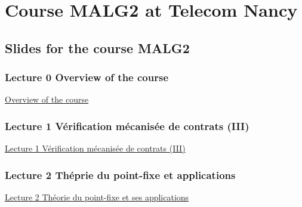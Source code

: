 \documentclass[ 12pt]{article}
\begin{document}
\section{Course MALG2 at Telecom Nancy}
\label{sec:course-mcfsi-at}


\subsection{Slides for the course MALG2}
\label{sec:slides}


\subsubsection{Lecture 0  {Overview of the course }}
  
  \href{http://mery54.github.io/teaching/movex/lecturesnotes/malglecture0.pdf}{Overview of the course }


   \subsubsection{Lecture 1 {Vérification  mécanisée de contrats} (III)}

   \href{http://mery54.github.io/teaching/movex/lecturesnotes/malglecture1.pdf}{Lecture
     1  Vérification  mécanisée de contrats (III)}


   
   \subsubsection{Lecture 2 {Théprie du point-fixe et applications}}

   \href{http://mery54.github.io/teaching/movex/lecturesnotes/malglecture2.pdf}{Lecture
     2  Théorie du point-fixe et ses applications}
   

  
  



 

\end{document}
